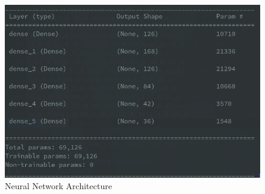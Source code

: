 \documentclass[12pt,a4paper]{report}
\begin{document}
\begin{figure}[htbp]
	\centerline{\includegraphics[scale=0.5]{neural_network.png}}
	\caption{Neural Network Architecture}
	\label{Neural_net}
\end{figure}
\end{document}
